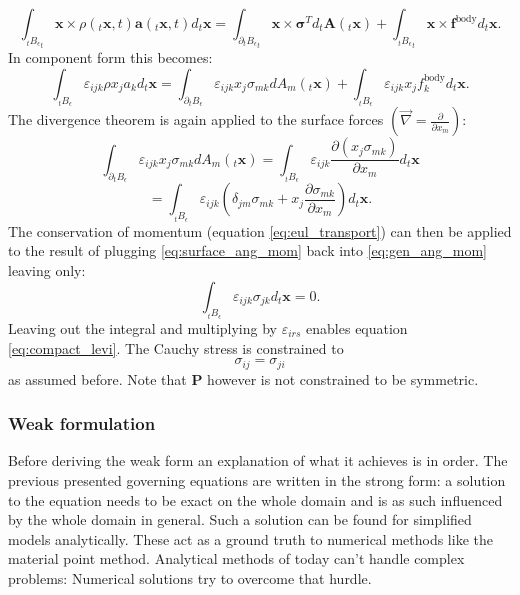 \documentclass[m,times]{cgMA}
\begin{document}
\begin{equation}
\int _ {_tB _ { \epsilon}  } _t\boldsymbol{x} \times \rho ( _t\boldsymbol{x} , t ) \boldsymbol{a} ( _t\boldsymbol{x} , t ) d _t\boldsymbol{x} = \int _ { \partial _tB _ {\epsilon  } }_t\boldsymbol{x} \times  \boldsymbol{\sigma}^T d_t\boldsymbol{A} (_t\boldsymbol{x} ) + \int _ { _tB_\epsilon }_t\boldsymbol{x} \times  \boldsymbol{f} ^ {\text{body} } d _t\boldsymbol{x}.
\end{equation}
In component form this becomes:
\begin{equation}\label{eq:gen_ang_mom}
  \int _ {_tB _ { \epsilon}  } \varepsilon_{ijk} \rho x_j a_k d _t\boldsymbol{x} = \int _ { \partial _tB _ {\epsilon  } } \varepsilon_{ijk} x_j \sigma_{mk} dA_m(_t\boldsymbol{x} ) + \int _ { _tB_\epsilon } \varepsilon_{ijk} x_j f_k ^ {\text{body} } d _t\boldsymbol{x}.
\end{equation}
The divergence theorem is again applied to the surface forces $\left(\vec{\nabla} = \frac{\partial}{\partial x_m}\right)$:
$$
\int _ { \partial _tB _ {\epsilon  } } \varepsilon_{ijk} x_j \sigma_{mk} dA_m (_t\boldsymbol{x} ) =
\int _ {_tB _ {\epsilon  } } \varepsilon_{ijk} \frac{\partial(x_j \sigma_{mk})}{\partial x_m} d_t\boldsymbol{x}
$$
\begin{equation}\label{eq:surface_ang_mom}
  = \int _ {_tB _ {\epsilon  } } \varepsilon_{ijk} \left(\delta_{jm} \sigma_{mk}+ x_j\frac{ \partial \sigma_{mk}}{\partial x_m}\right) d_t\boldsymbol{x}.
\end{equation}
The conservation of momentum (equation \ref{eq:eul_transport}) can then be applied to the result of plugging \ref{eq:surface_ang_mom} back into \ref{eq:gen_ang_mom} leaving only:
\begin{equation}
  \int _ {_tB _ {\epsilon  } } \varepsilon_{ijk} \sigma_{jk} d_t\boldsymbol{x} = 0.
\end{equation}
Leaving out the integral and multiplying by ${\varepsilon_{irs}}$ enables equation \ref{eq:compact_levi}. The Cauchy stress is constrained to
\begin{equation}
  \sigma_{ij} =\sigma_{ji}
\end{equation}
as assumed before. Note that $\boldsymbol{P}$ however is not constrained to be symmetric.
\begin{flushright}\cite{MPM:COURSE}\cite{MIT:CONTINUUM_MECHANICS}\end{flushright}
\subsubsection{Weak formulation}\label{sec:weak}
Before deriving the weak form an explanation of what it achieves is in order. The previous presented governing equations are written in the strong form: a solution to the equation needs to be exact on the whole domain and is as such influenced by the whole domain in general. Such a solution can be found for simplified models analytically. These act as a ground truth to numerical methods like the material point method. Analytical methods of today can't handle complex problems: Numerical solutions try to overcome that hurdle.
\end{document}
